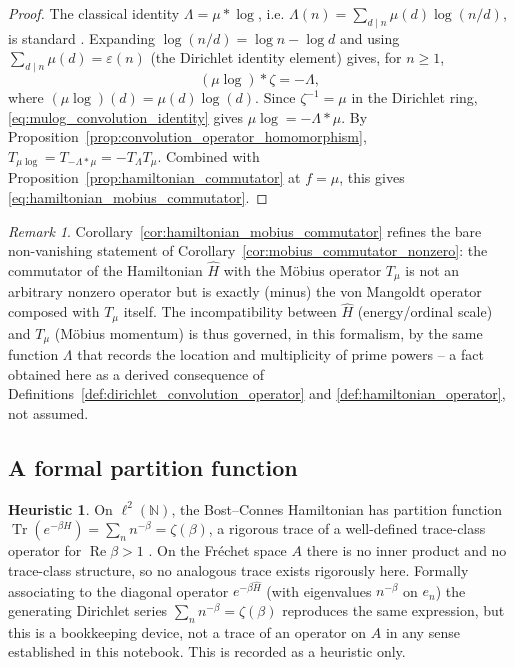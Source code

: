 \documentclass[11pt]{amsart}
\numberwithin{equation}{section}
\theoremstyle{plain}
\theoremstyle{definition}
\newtheorem{heuristic}[theorem]{Heuristic}
\theoremstyle{remark}
\newtheorem{remark}[theorem]{Remark}
\newcommand{\N}{\mathbb{N}}
\begin{document}
\begin{proof}
The classical identity $\Lambda = \mu * \log$, i.e.
$\Lambda(n)=\sum_{d\mid n}\mu(d)\log(n/d)$, is standard
\cite[Thm.~2.10]{Apostol1976}. Expanding $\log(n/d)=\log n-\log d$ and
using $\sum_{d\mid n}\mu(d)=\varepsilon(n)$ (the Dirichlet identity
element) gives, for $n\ge1$,
\begin{equation}
(\mu\log)*\zeta = -\Lambda,
\label{eq:mulog_convolution_identity}
\end{equation}
where $(\mu\log)(d)=\mu(d)\log(d)$. Since $\zeta^{-1}=\mu$ in the
Dirichlet ring, \eqref{eq:mulog_convolution_identity} gives
$\mu\log = -\Lambda*\mu$. By
Proposition~\ref{prop:convolution_operator_homomorphism},
$T_{\mu\log}=T_{-\Lambda*\mu}=-T_\Lambda T_\mu$. Combined with
Proposition~\ref{prop:hamiltonian_commutator} at $f=\mu$, this gives
\eqref{eq:hamiltonian_mobius_commutator}.
\end{proof}

\begin{remark}
\label{rem:hamiltonian_mobius_meaning}
Corollary~\ref{cor:hamiltonian_mobius_commutator} refines the bare
non-vanishing statement of
Corollary~\ref{cor:mobius_commutator_nonzero}: the commutator of the
Hamiltonian $\hat H$ with the M\"obius operator $T_\mu$ is not an
arbitrary nonzero operator but is exactly (minus) the von Mangoldt
operator composed with $T_\mu$ itself. The incompatibility between
$\hat H$ (energy/ordinal scale) and $T_\mu$ (M\"obius momentum) is thus
governed, in this formalism, by the same function $\Lambda$ that
records the location and multiplicity of prime powers -- a fact
obtained here as a derived consequence of
Definitions~\ref{def:dirichlet_convolution_operator} and
\ref{def:hamiltonian_operator}, not assumed.
\end{remark}

\subsection{A formal partition function}
\label{subsec:bc_flow_partition}

\begin{heuristic}
\label{heur:formal_partition_function}
On $\ell^2(\N)$, the Bost--Connes Hamiltonian has partition function
$\operatorname{Tr}(e^{-\beta H}) = \sum_n n^{-\beta} = \zeta(\beta)$, a
rigorous trace of a well-defined trace-class operator for
$\operatorname{Re}\beta>1$ \cite{BostConnes1995}. On the Fr\'echet
space $A$ there is no inner product and no trace-class structure, so
no analogous trace exists rigorously here. Formally associating to the
diagonal operator $e^{-\beta\hat H}$ (with eigenvalues $n^{-\beta}$ on
$e_n$) the generating Dirichlet series $\sum_n n^{-\beta}=\zeta(\beta)$
reproduces the same expression, but this is a bookkeeping device, not
a trace of an operator on $A$ in any sense established in this
notebook. This is recorded as a heuristic only.
\end{heuristic}
\end{document}
